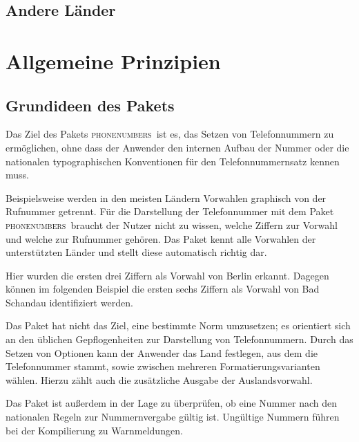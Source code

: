 \documentclass[numbers=noenddot]{scrreprt}
\newcommand*\Paket[1]{\textsc{#1}}
\newcommand\phone{\textcolor{cnltx}{\Paket{phone\-numbers}}}
\begin{document}
\section{Andere Länder}
\begin{sidebyside}
\end{sidebyside}

\begin{sidebyside}
\end{sidebyside}

\chapter{Allgemeine Prinzipien}
\section{Grundideen des Pakets}
Das Ziel des Pakets \phone\ ist es, das Setzen von Telefonnummern zu ermöglichen, ohne dass der Anwender den internen Aufbau der Nummer oder die nationalen typographischen Konventionen für den Telefonnummernsatz kennen muss.

Beispielsweise werden in den meisten Ländern Vorwahlen graphisch von der Rufnummer getrennt. Für die Darstellung der Telefonnummer mit dem Paket \phone\ braucht der Nutzer nicht zu wissen, welche Ziffern zur Vorwahl und welche zur Rufnummer gehören. Das Paket kennt alle Vorwahlen der unterstützten Länder und stellt diese automatisch richtig dar.
\begin{sidebyside}
\end{sidebyside}
Hier wurden die ersten drei Ziffern als Vorwahl von Berlin erkannt. Dagegen können im folgenden Beispiel die ersten sechs Ziffern als Vorwahl von Bad Schandau identifiziert werden.
\begin{sidebyside}
\end{sidebyside}

Das Paket hat nicht das Ziel, eine bestimmte Norm umzusetzen; es orientiert sich an den üblichen Gepflogenheiten zur Darstellung von Telefonnummern. Durch das Setzen von Optionen kann der Anwender das Land festlegen, aus dem die Telefonnummer stammt, sowie zwischen mehreren Formatierungsvarianten wählen. Hierzu zählt auch die zusätzliche Ausgabe der Auslandsvorwahl.

Das Paket ist außerdem in der Lage zu überprüfen, ob eine Nummer nach den nationalen Regeln zur Nummernvergabe gültig ist. Ungültige Nummern führen bei der Kompilierung zu Warnmeldungen.
\end{document}
